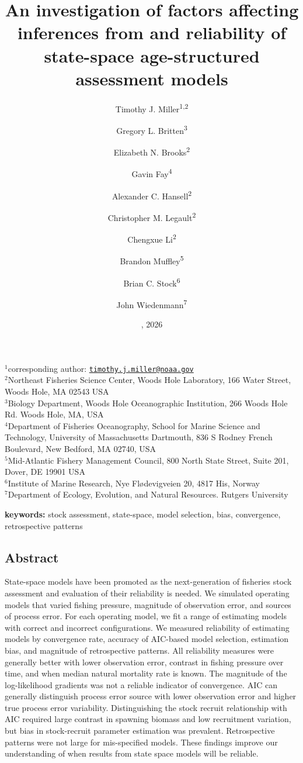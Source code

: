 \documentclass[
  12pt,
]{article}
\title{An investigation of factors affecting inferences from and
reliability of state-space age-structured assessment models}
\author{Timothy J. Miller\textsuperscript{1,2} \and Gregory L.
Britten\textsuperscript{3} \and Elizabeth N.
Brooks\textsuperscript{2} \and Gavin
Fay\textsuperscript{4} \and Alexander C.
Hansell\textsuperscript{2} \and Christopher M.
Legault\textsuperscript{2} \and Chengxue
Li\textsuperscript{2} \and Brandon Muffley\textsuperscript{5} \and Brian
C. Stock\textsuperscript{6} \and John Wiedenmann\textsuperscript{7}}
\date{\DIFdelbegin \DIFdel{04 January}\DIFdelend \DIFaddbegin \DIFadd{31 March}\DIFaddend , 2026}
\begin{document}
\maketitle

\(^1\)corresponding author:
\href{mailto:timothy.j.miller@noaa.gov}{\nolinkurl{timothy.j.miller@noaa.gov}}\\
\(^2\)Northeast Fisheries Science Center, Woods Hole Laboratory, 166
Water Street, Woods Hole, MA 02543 USA\\
\(^3\)Biology Department, Woods Hole Oceanographic Institution, 266
Woods Hole Rd. Woods Hole, MA, USA\\
\(^4\)Department of Fisheries Oceanography, School for Marine Science
and Technology, University of Massachusetts Dartmouth, 836 S Rodney
French Boulevard, New Bedford, MA 02740, USA\\
\(^5\)Mid-Atlantic Fishery Management Council, 800 North State Street,
Suite 201, Dover, DE 19901 USA\\
\(^6\)Institute of Marine Research, Nye Flødevigveien 20, 4817 His,
Norway\\
\(^7\)Department of Ecology, Evolution, and Natural Resources. Rutgers
University\\

\pagebreak

\textbf{keywords:} stock assessment, state-space, model selection, bias,
convergence, retrospective patterns

\subsection*{Abstract}\label{abstract}

State-space models have been promoted as the next-generation of
fisheries stock assessment and evaluation of their reliability is
needed. We simulated operating models that varied fishing pressure,
magnitude of observation error, and sources of process error. For each
operating model, we fit a range of estimating models with correct and
incorrect configurations. We measured reliability of estimating models
by convergence rate, accuracy of AIC-based model selection, estimation
bias, and magnitude of retrospective patterns. All reliability measures
were generally better with lower observation error, contrast in fishing
pressure over time, and when median natural mortality rate is known. The
magnitude of the log-likelihood gradients was not a reliable indicator
of convergence. AIC can generally distinguish process error source with
lower observation error and higher true process error variability.
Distinguishing the stock recruit relationship with AIC required large
contrast in spawning biomass and low recruitment variation, but bias in
stock-recruit parameter estimation was prevalent. Retrospective patterns
were not large for mis-specified models. These findings improve our
understanding of when results from state space models will be reliable.
\end{document}
